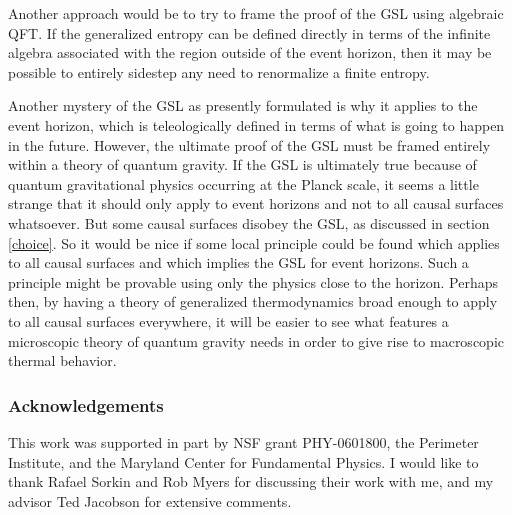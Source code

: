 \documentclass[12pt]{article}
\begin{document}
Another approach would be to try to frame the proof of the GSL using algebraic QFT.  If the generalized entropy can be defined directly in terms of the infinite algebra associated with the region outside of the event horizon, then it may be possible to entirely sidestep any need to renormalize a finite entropy.

Another mystery of the GSL as presently formulated is why it applies to the event horizon, which is teleologically defined in terms of what is going to happen in the future.  However, the ultimate proof of the GSL must be framed entirely within a theory of quantum gravity.  If the GSL is ultimately true because of quantum gravitational physics occurring at the Planck scale, it seems a little strange that it should only apply to event horizons and not to all causal surfaces whatsoever.  But some causal surfaces disobey the GSL, as discussed in section \ref{choice}.  So it would be nice if some local principle could be found which applies to all causal surfaces and which implies the GSL for event horizons.  Such a principle might be provable using only the physics close to the horizon.  Perhaps then, by having a theory of generalized thermodynamics broad enough to apply to all causal surfaces everywhere, it will be easier to see what features a microscopic theory of quantum gravity needs in order to give rise to macroscopic thermal behavior.

\vspace{-4pt}

\small
\subsubsection*{Acknowledgements}

This work was supported in part by NSF grant PHY-0601800, the Perimeter Institute, and the Maryland Center for Fundamental Physics.  I would like to thank Rafael Sorkin and Rob Myers for discussing their work with me, and my advisor Ted Jacobson for extensive comments.
\normalsize

\vspace{-8pt}
\end{document}
